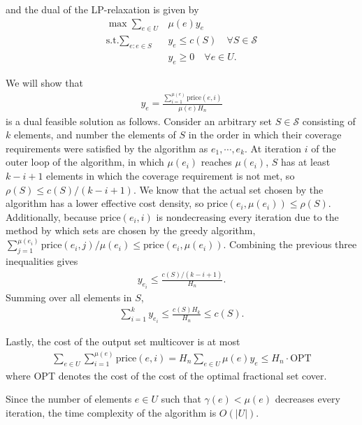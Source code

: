 \documentclass[a4paper,11pt]{article}
\begin{document}
and the dual of the LP-relaxation is given by
\begin{align*}
    \max \sum_{e \in U} &\mu(e) y_e \\
    \text{s.t.} \sum_{e : e \in S} &y_e \leq c(S) \quad \forall S \in \mathcal{S} \\
    &y_e \geq 0 \quad \forall e \in U.
\end{align*} \par
We will show that
\begin{align*}
    y_e = \frac{\sum_{i = 1}^{\mu(e)} \text{price}(e, i)}{\mu(e) H_n}
\end{align*}
is a dual feasible solution as follows. Consider an arbitrary set $S \in \mathcal{S}$ consisting of $k$ elements, and number the elements of $S$ in the order in which their coverage requirements were satisfied by the algorithm as $e_1, \cdots, e_k$. At iteration $i$ of the outer loop of the algorithm, in which $\mu(e_i)$ reaches $\mu(e_i)$, $S$ has at least $k - i + 1$ elements in which the coverage requirement is not met, so $\rho(S) \leq c(S)/(k - i + 1)$. We know that the actual set chosen by the algorithm has a lower effective cost density, so $\text{price}(e_i, \mu(e_i)) \leq \rho(S)$. Additionally, because $\text{price}(e_i, i)$ is nondecreasing every iteration due to the method by which sets are chosen by the greedy algorithm, $\sum_{j = 1}^{\mu(e_i)} \text{price}(e_i, j) / \mu(e_i) \leq \text{price}(e_i, \mu(e_i))$. Combining the previous three inequalities gives
\begin{align*}
    y_{e_i} \leq \frac{c(S)/(k - i + 1)}{H_n}.
\end{align*}
Summing over all elements in $S$,
\begin{align*}
    \sum_{i = 1}^k y_{e_i} \leq \frac{c(S) H_k}{H_n} \leq c(S).
\end{align*} \par
Lastly, the cost of the output set multicover is at most
\begin{align*}
    \sum_{e \in U} \sum_{i = 1}^{\mu(e)} \text{price}(e, i) = H_n \sum_{e \in U} \mu(e) y_e \leq H_n \cdot \text{OPT}
\end{align*}
where OPT denotes the cost of the cost of the optimal fractional set cover. \par
Since the number of elements $e \in U$ such that $\gamma(e) < \mu(e)$ decreases every iteration, the time complexity of the algorithm is $O(|U|)$. \\
\end{document}
